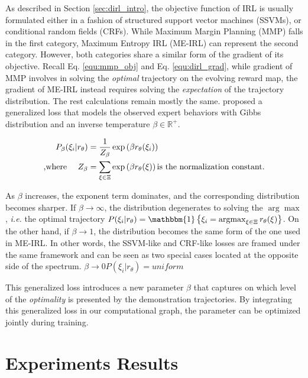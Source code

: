 \documentclass[../thesis.tex]{subfiles}
\begin{document}
As described in Section \ref{sec:dirl_intro}, the objective function of IRL is usually formulated either in a fashion of structured support vector machines (SSVMs), or conditional random fields (CRFs).
While Maximum Margin Planning (MMP) falls in the first category, Maximum Entropy IRL (ME-IRL) can represent the second category.
However, both categories share a similar form of the gradient of its objective.
Recall Eq. \ref{equ:mmp_obj} and Eq. \ref{equ:dirl_grad}, while gradient of MMP involves in solving the \textit{optimal} trajectory on the evolving reward map, the gradient of ME-IRL instead requires solving the \textit{expectation} of the trajectory distribution.
The rest calculations remain mostly the same.
\citet{pletscher2010entropy} proposed a generalized loss that models the observed expert behaviors with Gibbs distribution and an inverse temperature $\beta \in \mathbb R^{+}$.
 
\begin{align}
P_{\beta}(\xi_i | r_\theta) &= \frac{1}{Z_\beta} \exp \left( \beta r_\theta(\xi_i) \right) \\
\text{,where \quad} Z_\beta &= \sum_{\xi \in \Xi} \exp \left( \beta r_\theta(\xi) \right) \text{is the normalization constant.}
\end{align}
 
As $\beta$ increases, the exponent term dominates, and the corresponding distribution becomes sharper.
If $\beta \to \infty$, the distribution degenerates to solving the $\arg\max$, \textit{i.e.} the optimal trajectory 
$P(\xi_i | r_\theta)= \mathbbm{1}\left\{ \xi_i = \argmaxE_{\xi \in \Xi} r_\theta(\xi) \right\}  $.
On the other hand, if $\beta \to 1$, the distribution becomes the same form of the one used in ME-IRL.
In other words, the SSVM-like and CRF-like losses are framed under the same framework and can be seen as two special cases located at the opposite side of the spectrum.
$\beta \to 0 P(\xi_i | r_\theta)= uniform $


This generalized loss introduces a new parameter $\beta$ that captures on which level of the \textit{optimality} is presented by the demonstration trajectories. By integrating this generalized loss in our computational graph, the parameter can be optimized jointly during training.
 
\section{Experiments Results}
 
\end{document}
